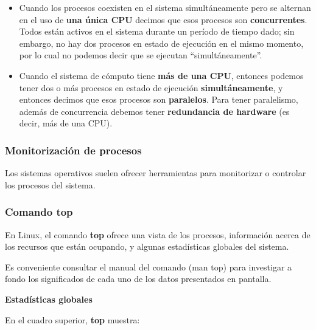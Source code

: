 \documentclass[spanish,a4paper,]{article}
\begin{document}
\begin{itemize}
\item
  Cuando los procesos coexisten en el sistema simultáneamente pero se
  alternan en el uso de \textbf{una única CPU} decimos que esos procesos
  son \textbf{concurrentes}. Todos están activos en el sistema durante
  un período de tiempo dado; sin embargo, no hay dos procesos en estado
  de ejecución en el mismo momento, por lo cual no podemos decir que se
  ejecutan ``simultáneamente''.
\item
  Cuando el sistema de cómputo tiene \textbf{más de una CPU}, entonces
  podemos tener dos o más procesos en estado de ejecución
  \textbf{simultáneamente}, y entonces decimos que esos procesos son
  \textbf{paralelos}. Para tener paralelismo, además de concurrencia
  debemos tener \textbf{redundancia de hardware} (es decir, más de una
  CPU).
\end{itemize}

\hypertarget{monitorizaciuxf3n-de-procesos}{%
\subsubsection{Monitorización de
procesos}\label{monitorizaciuxf3n-de-procesos}}

Los sistemas operativos suelen ofrecer herramientas para monitorizar o
controlar los procesos del sistema.

\hypertarget{comando-top}{%
\subsubsection{Comando top}\label{comando-top}}

En Linux, el comando \textbf{top} ofrece una vista de los procesos,
información acerca de los recursos que están ocupando, y algunas
estadísticas globales del sistema.

Es conveniente consultar el manual del comando (man top) para investigar
a fondo los significados de cada uno de los datos presentados en
pantalla.

\textbf{Estadísticas globales}

En el cuadro superior, \textbf{top} muestra:
\end{document}
